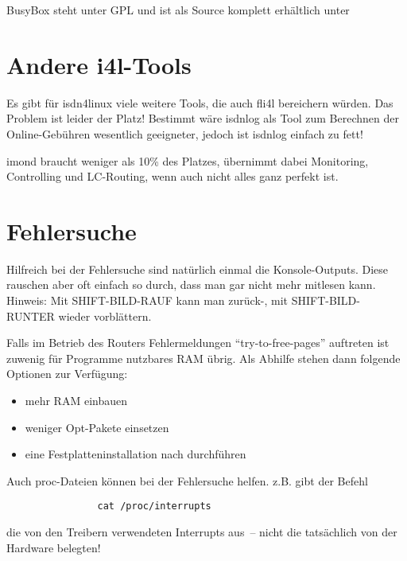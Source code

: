     BusyBox steht unter GPL und ist als Source komplett erhältlich
    unter



    \section{Andere i4l-Tools}

    Es gibt für isdn4linux viele weitere Tools, die auch fli4l
    bereichern würden. Das Problem ist leider der Platz! Bestimmt wäre
    isdnlog als Tool zum Berechnen der Online-Gebühren wesentlich
    geeigneter, jedoch ist isdnlog einfach zu fett!

    imond braucht weniger als 10\% des Platzes, übernimmt dabei Monitoring,
    Controlling und LC-Routing, wenn auch nicht alles ganz perfekt
    ist.

    \section{Fehlersuche}

    Hilfreich bei der Fehlersuche sind natürlich einmal die
    Konsole-Outputs.  Diese rauschen aber oft einfach so durch, dass
    man gar nicht mehr mitlesen kann. Hinweis: Mit SHIFT-BILD-RAUF
    kann man zurück-, mit SHIFT-BILD-RUNTER wieder vorblättern.

    Falls im Betrieb des Routers Fehlermeldungen ``try-to-free-pages''
    auftreten ist zuwenig für Programme nutzbares RAM übrig. Als
    Abhilfe stehen dann folgende Optionen zur Verfügung:
    \begin{itemize}
    \item mehr RAM einbauen
    \item weniger Opt-Pakete einsetzen
    \item eine Festplatteninstallation nach 
      durchführen
    \end{itemize}

    Auch proc-Dateien können bei der Fehlersuche helfen. z.B. gibt der
    Befehl

\begin{example}
\begin{verbatim}
                cat /proc/interrupts
\end{verbatim}
\end{example}
    
    die von den Treibern verwendeten Interrupts aus~-- nicht die
    tatsächlich von der Hardware belegten!
    

